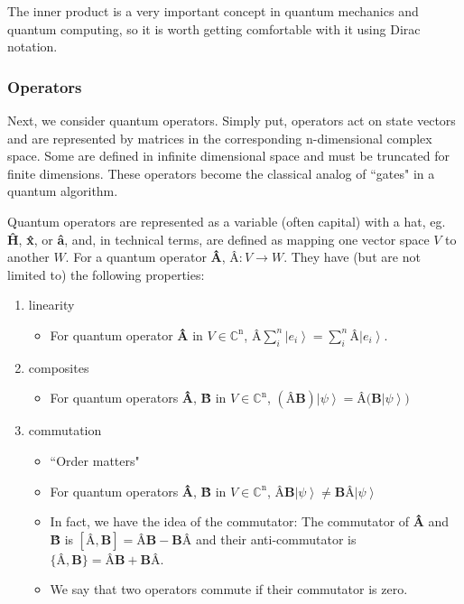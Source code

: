\documentclass[11pt]{article} %
\newcommand{\ket}[1]{\left|#1\right\rangle}
\begin{document}
The inner product is a very important concept in quantum mechanics and quantum computing, so it is worth getting comfortable with it using Dirac notation.


\subsubsection{Operators} \label{operators}
Next, we consider quantum operators. Simply put, operators act on state vectors and are represented by matrices in the corresponding n-dimensional complex space. Some are defined in infinite dimensional space and must be truncated for finite dimensions. These operators become the classical analog of ``gates" in a quantum algorithm.

Quantum operators are represented as a variable (often capital) with a hat, eg. \textbf{\^{H}}, \textbf{\^{x}}, or \textbf{\^{a}}, and, in technical terms, are defined as mapping one vector space $V$ to another $W$. For a quantum operator \textbf{\^{A}}, $\textbf{\^{A}}: V \rightarrow W$. They have (but are not limited to) the following properties:

\begin{enumerate}
    \item linearity
        \begin{itemize}
            \item For quantum operator \textbf{\^{A}} in $V \in \mathbb{C}^\textrm{n}$, $\textbf{\^{A}}\sum^n_i \ket{e_i} = \sum^n_i \textbf{\^{A}}\ket{e_i}$.
        \end{itemize}
    \item composites
        \begin{itemize}
            \item For quantum operators \textbf{\^{A}}, \textbf{\^{B}} in $V \in \mathbb{C}^\textrm{n}$, $(\textbf{\^{A}\^{B}}) \ket{\psi} = \textbf{\^{A}(\^{B}} \ket{\psi})$
        \end{itemize}
    \item commutation
        \begin{itemize}
            \item ``Order matters"
            \item For quantum operators \textbf{\^{A}}, \textbf{\^{B}} in $V \in \mathbb{C}^\textrm{n}$, $\textbf{\^{A}\^{B}}\ket{\psi} \neq \textbf{\^{B}\^{A}} \ket{\psi}$
            \item In fact, we have the idea of the commutator: The commutator of \textbf{\^{A}} and \textbf{\^{B}} is $[\textbf{\^{A}},\textbf{\^{B}}] = \textbf{\^{A}\^{B}} - \textbf{\^{B}\^{A}}$ and their anti-commutator is $\{\textbf{\^{A}},\textbf{\^{B}}\} = \textbf{\^{A}\^{B}} + \textbf{\^{B}\^{A}}$.
            \item We say that two operators commute if their commutator is zero.
        \end{itemize}
\end{enumerate}
\end{document}
